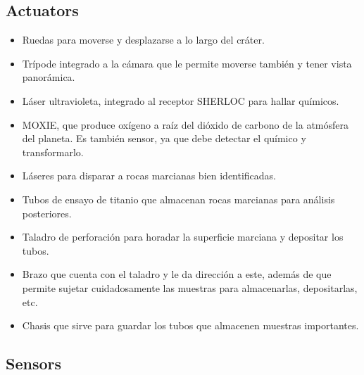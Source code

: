 \documentclass[12pt, letterpaper]{article}
\begin{document}
    \subsection{Actuators}\label{actuators}

        \begin{itemize}

            \item Ruedas para moverse y desplazarse a lo largo del cráter.
            \item Trípode integrado a la cámara que le permite moverse también y tener vista panorámica.
            \item Láser ultravioleta, integrado al receptor SHERLOC para hallar químicos.
            \item MOXIE\cite{hoffman2022mars}, que produce oxígeno a raíz del dióxido de carbono de la atmósfera del planeta. Es también sensor, ya que debe detectar el químico y transformarlo.
            \item Láseres para disparar a rocas marcianas bien identificadas.
            \item Tubos de ensayo de titanio que almacenan rocas marcianas para análisis posteriores.
            \item Taladro de perforación para horadar la superficie marciana y depositar los tubos.
            \item Brazo que cuenta con el taladro y le da dirección a este, además de que permite sujetar cuidadosamente las muestras para almacenarlas, depositarlas, etc.
            \item Chasis que sirve para guardar los tubos que almacenen muestras importantes.
        
        \end{itemize}
    
    \subsection{Sensors}\label{sensors}
\end{document}
